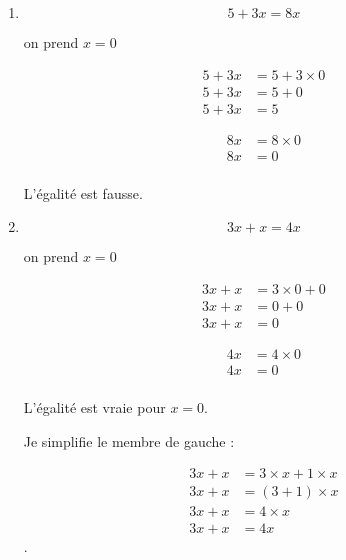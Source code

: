 \documentclass[12pt,a4paper]{article}
\begin{document}
\begin{enumerate}
\begin{multicols}{2}
	\end{multicols}
	
	L'égalité est fausse.
	
	
	\item \begin{equation*}
	5 + 3x = 8x
	\end{equation*}
	
	on prend $x = 0$ 
	
	\begin{multicols}{2}
		\begin{align*}
			5 + 3x &= 5 + 3 \times 0 \\
			5 + 3x &= 5 +0 \\
			5 + 3x &= 5
		\end{align*} 
		
		
		\begin{align*}
			8x &= 8 \times 0 \\
			8x &= 0 \\
		\end{align*}
		
	\end{multicols}
	
	L'égalité est fausse.
	
	\newpage
	
	\item \begin{equation*}
	3x + x = 4x
	\end{equation*}
	
	on prend $x = 0$ 
	
	\begin{multicols}{2}
		\begin{align*}
		3x + x &= 3 \times 0 +  0 \\
		3x + x &= 0 +0 \\
		3x + x &= 0
		\end{align*} 
		
		
		\begin{align*}
			4x &= 4 \times 0 \\
			4x &= 0 \\
		\end{align*}
		
	\end{multicols}
	
	L'égalité est vraie pour $x=0$.
	
	Je simplifie le membre de gauche :
	
	\begin{align*}
		3x + x &=  3 \times x + 1 \times x \\
		3x + x &=  (3 + 1) \times x \\
		3x + x &=  4 \times x \\
		3x + x &=  4x 
	\end{align*}.
	

\end{enumerate}
\end{document}

